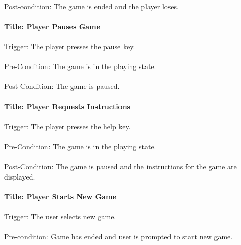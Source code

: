 \documentclass[12pt, titlepage]{article}
\begin{document}
\paragraph{}
Post-condition: The game is ended and the player loses.

\paragraph{Title: Player Pauses Game}
\paragraph{}
Trigger: The player presses the pause key.
\paragraph{}
Pre-Condition: The game is in the playing state.
\paragraph{}
Post-Condition: The game is paused.

\paragraph{Title: Player Requests Instructions}
\paragraph{}
Trigger: The player presses the help key.
\paragraph{}
Pre-Condition: The game is in the playing state.
\paragraph{}
Post-Condition: The game is paused and the instructions for the game are displayed.

\paragraph{Title: Player Starts New Game}
\paragraph{}
Trigger: The user selects new game.
\paragraph{}
Pre-condition: Game has ended and user is prompted to start new game.
\end{document}
